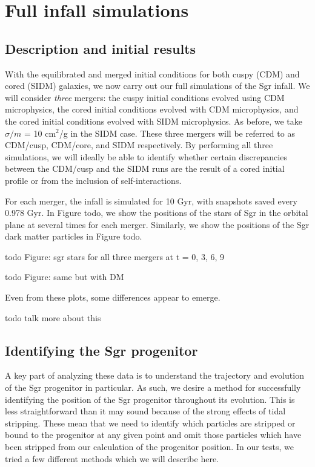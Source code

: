 \hypertarget{full-infall-simulations}{%
\chapter{Full infall simulations}\label{full-infall-simulations}}

\hypertarget{description-and-initial-results}{%
\section{Description and initial
results}\label{description-and-initial-results}}

With the equilibrated and merged initial conditions for both cuspy (CDM) and
cored (SIDM) galaxies, we now carry out our full simulations of the Sgr
infall.  We will consider \emph{three} mergers: the cuspy initial conditions
evolved using CDM microphysics, the cored initial conditions evolved with CDM
microphysics, and the cored initial conditions evolved with SIDM microphysics.
As before, we take \(\sigma / m\) = 10 cm\(^2\)/g in the SIDM case.  These
three mergers will be referred to as CDM/cusp, CDM/core, and SIDM
respectively.  By performing all three simulations, we will ideally be able to
identify whether certain discrepancies between the CDM/cusp and the SIDM runs
are the result of a cored initial profile or from the inclusion of
self-interactions.

For each merger, the infall is simulated for 10 Gyr, with snapshots saved
every 0.978 Gyr.  In Figure todo, we show the positions of the stars of Sgr in
the orbital plane at several times for each merger.  Similarly, we show the
positions of the Sgr dark matter particles in Figure todo.

todo Figure: sgr stars for all three mergers at t = 0, 3, 6, 9

todo Figure: same but with DM

Even from these plots, some differences appear to emerge.

todo talk more about this

\hypertarget{identifying-the-sgr-progenitor}{%
\section{Identifying the Sgr
progenitor}\label{identifying-the-sgr-progenitor}}

A key part of analyzing these data is to understand the trajectory and
evolution of the Sgr progenitor in particular. As such, we desire a
method for successfully identifying the position of the Sgr progenitor
throughout its evolution. This is less straightforward than it may sound
because of the strong effects of tidal stripping. These mean that we
need to identify which particles are stripped or bound to the progenitor
at any given point and omit those particles which have been stripped
from our calculation of the progenitor position. In our tests, we tried
a few different methods which we will describe here.

